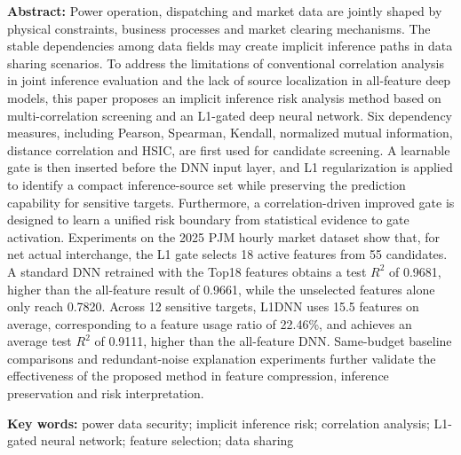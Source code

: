 \documentclass[UTF8,zihao=5,twoside]{ctexart}
\numberwithin{equation}{section}
\newcommand{\fundcn}{基金项目：无。}
\newcommand{\funden}{Foundation item: None.}
\begin{document}
\noindent\textbf{Abstract:} Power operation, dispatching and market data are jointly shaped by physical constraints, business processes and market clearing mechanisms. The stable dependencies among data fields may create implicit inference paths in data sharing scenarios. To address the limitations of conventional correlation analysis in joint inference evaluation and the lack of source localization in all-feature deep models, this paper proposes an implicit inference risk analysis method based on multi-correlation screening and an L1-gated deep neural network. Six dependency measures, including Pearson, Spearman, Kendall, normalized mutual information, distance correlation and HSIC, are first used for candidate screening. A learnable gate is then inserted before the DNN input layer, and L1 regularization is applied to identify a compact inference-source set while preserving the prediction capability for sensitive targets. Furthermore, a correlation-driven improved gate is designed to learn a unified risk boundary from statistical evidence to gate activation. Experiments on the 2025 PJM hourly market dataset show that, for net actual interchange, the L1 gate selects 18 active features from 55 candidates. A standard DNN retrained with the Top18 features obtains a test $R^2$ of 0.9681, higher than the all-feature result of 0.9661, while the unselected features alone only reach 0.7820. Across 12 sensitive targets, L1DNN uses 15.5 features on average, corresponding to a feature usage ratio of 22.46\%, and achieves an average test $R^2$ of 0.9111, higher than the all-feature DNN. Same-budget baseline comparisons and redundant-noise explanation experiments further validate the effectiveness of the proposed method in feature compression, inference preservation and risk interpretation.\par
\noindent\textbf{Key words:} power data security; implicit inference risk; correlation analysis; L1-gated neural network; feature selection; data sharing\par\vspace{0.8em}

\noindent{\small\fundcn\\\funden}
\end{document}

